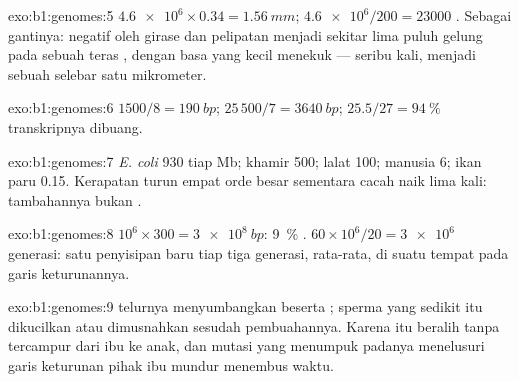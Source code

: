 \begin{solution}{exo:b1:genomes:5}
$\num{4.6e6}\times 0.34 = \qty{1.56}{mm}$; $\num{4.6e6}/200 = \num{23000}$
. Sebagai gantinya:  negatif oleh girase dan
pelipatan menjadi sekitar lima puluh gelung pada sebuah teras ,
dengan  basa yang kecil menekuk  --- seribu kali, menjadi
sebuah  selebar satu mikrometer.
\end{solution}

\begin{solution}{exo:b1:genomes:6}
 $1500/8 = \qty{190}{bp}$;  $25\,500/7 = \qty{3640}{bp}$;
$25.5/27 = \qty{94}{\%}$ transkripnya dibuang.
\end{solution}

\begin{solution}{exo:b1:genomes:7}
\emph{E. coli} 930  tiap Mb; khamir 500; lalat 100; manusia 6; ikan
paru 0.15. Kerapatan  turun empat orde besar sementara cacah
 naik lima kali:  tambahannya bukan .
\end{solution}

\begin{solution}{exo:b1:genomes:8}
$10^6\times 300 = \qty{3e8}{bp}$: \qty{9}{\%} . $60\times
10^6/20 = \num{3e6}$ generasi: satu penyisipan baru tiap tiga generasi,
rata-rata, di suatu tempat pada garis keturunannya.
\end{solution}

\begin{solution}{exo:b1:genomes:9}
 telurnya menyumbangkan  beserta ;
 sperma yang sedikit itu dikucilkan atau dimusnahkan sesudah
pembuahannya. Karena itu   beralih tanpa tercampur
dari ibu ke anak, dan mutasi yang menumpuk padanya menelusuri garis
keturunan pihak ibu mundur menembus waktu.
\end{solution}

